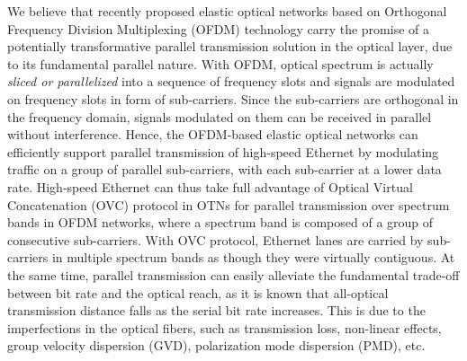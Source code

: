 \documentclass[conference]{IEEEtran}
\begin{document}
\par We believe that recently proposed elastic optical networks based on Orthogonal Frequency Division Multiplexing (OFDM)  technology carry the promise of a potentially transformative parallel transmission solution in the optical layer, due to its fundamental parallel nature.   With OFDM, optical spectrum is  actually \emph{sliced or parallelized}  into a sequence of frequency slots and  signals are modulated on frequency slots in form of sub-carriers. Since the sub-carriers are orthogonal in the frequency domain, signals modulated on them can be received in parallel without interference. Hence, the OFDM-based elastic optical networks can efficiently support  parallel transmission of high-speed Ethernet by modulating  traffic on a group of parallel sub-carriers,  with each sub-carrier at a lower data rate.  High-speed Ethernet can thus take full advantage of Optical Virtual Concatenation (OVC) protocol in OTNs for parallel transmission over  spectrum bands in OFDM networks, where a spectrum band is composed of a group of consecutive sub-carriers. With OVC protocol,   Ethernet lanes are  carried by  sub-carriers in multiple spectrum bands as though they were virtually contiguous. At the same time,  parallel transmission can easily alleviate the fundamental trade-off between bit rate and the optical reach, as it is known that all-optical transmission distance falls as the serial bit rate increases. This is due to the imperfections in the optical fibers, such as transmission loss, non-linear effects, group velocity dispersion (GVD), polarization mode dispersion (PMD), etc.    
\end{document}
